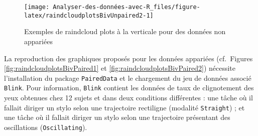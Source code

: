 \documentclass[
  french,
]{book}
\newenvironment{Shaded}{\begin{snugshade}}{\end{snugshade}}
\newcommand{\CommentTok}[1]{\textcolor[rgb]{0.56,0.35,0.01}{\textit{#1}}}
\newcommand{\DataTypeTok}[1]{\textcolor[rgb]{0.13,0.29,0.53}{#1}}
\newcommand{\KeywordTok}[1]{\textcolor[rgb]{0.13,0.29,0.53}{\textbf{#1}}}
\newcommand{\NormalTok}[1]{#1}
\newcommand{\OperatorTok}[1]{\textcolor[rgb]{0.81,0.36,0.00}{\textbf{#1}}}
\newcommand{\StringTok}[1]{\textcolor[rgb]{0.31,0.60,0.02}{#1}}
\begin{document}
\begin{figure}

{\centering \texttt{[image: Analyser-des-données-avec-R\_files/figure-latex/raindcloudplotsBivUnpaired2-1]} 

}

\caption{Exemples de raindcloud plots à la verticale pour des données non appariées}\label{fig:raindcloudplotsBivUnpaired2}
\end{figure}

La reproduction des graphiques proposés pour les données appariées (cf.~Figures \ref{fig:raindcloudplotsBivPaired1} et \ref{fig:raindcloudplotsBivPaired2}) nécessite l'installation du package \texttt{PairedData} et le chargement du jeu de données associé \texttt{Blink}. Pour information, \texttt{Blink} contient les données de taux de clignotement des yeux obtenues chez 12 sujets et dans deux conditions différentes : une tâche où il fallait diriger un stylo selon une trajectoire rectiligne (modalité \texttt{Straight}) ; et une tâche où il fallait diriger un stylo selon une trajectoire présentant des oscillations (\texttt{Oscillating}).

\begin{Shaded}
\end{Shaded}
\end{document}
